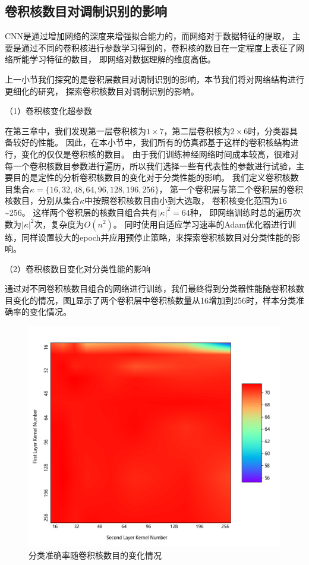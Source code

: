 \subsection{卷积核数目对调制识别的影响}
CNN是通过增加网络的深度来增强拟合能力的，而网络对于数据特征的提取，
主要是通过不同的卷积核进行参数学习得到的，卷积核的数目在一定程度上表征了网络所能学习特征的数目，
即网络对数据理解的维度高低。\par
上一小节我们探究的是卷积层数目对调制识别的影响，本节我们将对网络结构进行更细化的研究，
探索卷积核数目对调制识别的影响。\par
（1）卷积核变化超参数\par
在第三章中，我们发现第一层卷积核为$1 \times 7$，第二层卷积核为$2 \times 6$时，分类器具备较好的性能。
因此，在本小节中，我们所有的仿真都基于这样的卷积核结构进行，变化的仅仅是卷积核的数目。
由于我们训练神经网络时间成本较高，很难对每一个卷积核数目参数进行遍历，所以我们选择一些有代表性的参数进行试验，主要目的是定性的分析卷积核数目的变化对于分类性能的影响。
我们定义卷积核数目集合$\kappa =\{16, 32, 48, 64,  96, 128, 196, 256\}$，
第一个卷积层与第二个卷积层的卷积核数目，分别从集合$\kappa$中按照卷积核数目由小到大选取，
卷积核变化范围为16 \textasciitilde 256。
这样两个卷积层的核数目组合共有$|\kappa|^2=64$种，
即网络训练时总的遍历次数为$|\kappa|^2$次，复杂度为$O(n^2)$。
同时使用自适应学习速率的Adam优化器进行训练，同样设置较大的epoch并应用预停止策略，来探索卷积核数目对分类性能的影响。\par

（2）卷积核数目变化对分类性能的影响\par

通过对不同卷积核数目组合的网络进行训练，我们最终得到分类器性能随卷积核数目变化的情况，图\ref{fig_5_3}显示了两个卷积层中卷积核数量从16增加到256时，样本分类准确率的变化情况。\par
\begin{figure}[!h]
	\centering
	\includegraphics[width=0.7\linewidth, height=0.6\linewidth]{figures/chapter_5/fig_5_10}
	\caption{分类准确率随卷积核数目的变化情况}
	\label{fig_5_3}
\end{figure}

